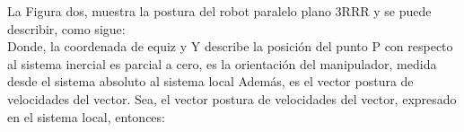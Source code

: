 \documentclass[letter,openright,12pt,spanish]{report}
\begin{document}
La Figura dos, muestra la postura del robot paralelo plano 3RRR y se puede describir, como sigue:\\
Donde, la coordenada de equiz y Y describe la posición del punto P con respecto al sistema inercial es parcial a cero, es la orientación del manipulador, medida desde el sistema absoluto al sistema local Además, es el vector postura de velocidades del vector. Sea, el vector postura de velocidades del vector, expresado en el sistema local, entonces:



\nocite{*}
\cite{de2017ingenieria}


\end{document}
